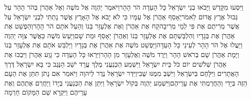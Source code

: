 \documentclass[../main/main.tex]{subfiles}
\begin{document}
\begin{multicols}{\ncols}
וַיִּסְעוּ מִקָּדֵשׁ וַיָּבֹאוּ בְנֵי יִשְׂרָאֵל כָּל הָעֵדָה הֹר הָהָר\PreVerseSpace{}וַיֹּאמֶר יַהְוֶה אֶל מֹשֶׁה וְאֶל אַהֲרֹן בְּהֹר הָהָר עַל גְּבוּל אֶרֶץ אֱדוֹם לֵאמֹר\PreVerseSpace{}יֵאָסֵף אַהֲרֹן אֶל עַמָּיו כִּי לֹא יָבֹא אֶל הָאָרֶץ אֲשֶׁר נָתַתִּי לִבְנֵי יִשְׂרָאֵל עַל אֲשֶׁר מְרִיתֶם אֶת פִּי לְמֵי מְרִיבָה\PreVerseSpace{}קַח אֶת אַהֲרֹן וְאֶת אֶלְעָזָר בְּנוֹ וְהַעַל אֹתָם הֹר הָהָר\PreVerseSpace{}וְהַפְשֵׁט אֶת אַהֲרֹן אֶת בְּגָדָיו וְהִלְבַּשְׁתָּם אֶת אֶלְעָזָר בְּנוֹ וְאַהֲרֹן יֵאָסֵף וּמֵת שָׁם\PreVerseSpace{}וַיַּעַשׂ מֹשֶׁה כַּאֲשֶׁר צִוָּה יַהְוֶה וַיַּעֲלוּ אֶל הֹר הָהָר לְעֵינֵי כָּל הָעֵדָה\PreVerseSpace{}וַיַּפְשֵׁט מֹשֶׁה אֶת אַהֲרֹן אֶת בְּגָדָיו וַיַּלְבֵּשׁ אֹתָם אֶת אֶלְעָזָר בְּנוֹ וַיָּמָת אַהֲרֹן שָׁם בְּרֹאשׁ הָהָר וַיֵּרֶד מֹשֶׁה וְאֶלְעָזָר מִן הָהָר\PreVerseSpace{}וַיִּרְאוּ כָּל הָעֵדָה כִּי גָוַע אַהֲרֹן וַיִּבְכּוּ אֶת אַהֲרֹן שְׁלֹשִׁים יוֹם כֹּל בֵּית יִשְׂרָאֵל \ClosedSection{}וַיִּשְׁמַע הַכְּנַעֲנִי מֶלֶךְ עֲרָד יֹשֵׁב הַנֶּגֶב כִּי בָּא יִשְׂרָאֵל דֶּרֶךְ הָאֲתָרִים וַיִּלָּחֶם בְּיִשְׂרָאֵל וַיִּשְׁבְּ מִמֶּנּוּ שֶׁבִי\PreVerseSpace{}וַיִּדַּר יִשְׂרָאֵל נֶדֶר לַיהוָה וַיֹּאמַר אִם נָתֹן תִּתֵּן אֶת הָעָם הַזֶּה בְּיָדִי וְהַחֲרַמְתִּי אֶת עָרֵיהֶם\PreVerseSpace{}וַיִּשְׁמַע יַהְוֶה בְּקוֹל יִשְׂרָאֵל וַיִּתֵּן אֶת הַכְּנַעֲנִי בְּיָדוֹ\OmitEnd{} וַיַּחֲרֵם אֶתְהֶם וְאֶת עָרֵיהֶם וַיִּקְרָא שֵׁם הַמָּקוֹם חָרְמָה\OpenSection{}\par

\end{multicols}
\end{document}
